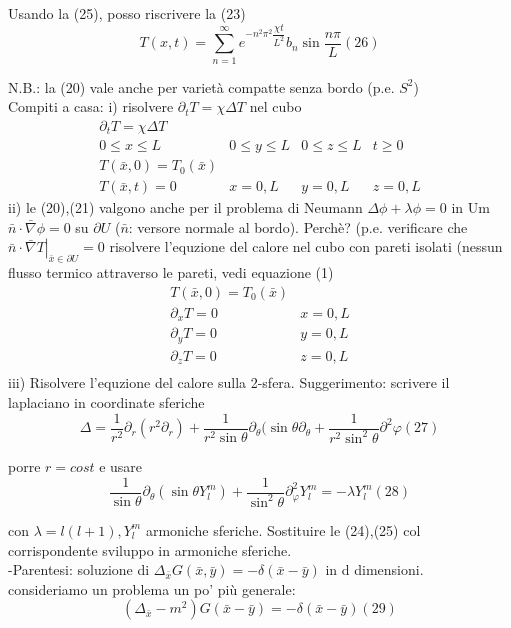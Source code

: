 \documentclass[a4paper,11pt]{report}
\begin{document}
Usando la (25), posso riscrivere la (23)
\begin{equation}
T(x,t)=\sum_{n=1}^{\infty}e^{-n^2\pi^2\dfrac{\chi t}{L^2}}b_n\sin\dfrac{n\pi}{L} (26)
\end{equation}

N.B.: la (20) vale anche per varietà compatte senza bordo (p.e. $S^2$)\\
Compiti a casa:
i) risolvere $\partial_t T=\chi\Delta T$ nel cubo
$$
\begin{matrix}
\partial_t T=\chi\Delta T\\
0\leq x\leq L & 0\leq y\leq L & 0\leq z\leq L & t\geq 0\\
T(\bar{x},0)=T_0(\bar{x})\\
T(\bar{x},t)=0 & x=0,L & y=0,L & z=0,L 
\end{matrix}
$$
ii) le (20),(21) valgono anche per il problema di Neumann $\Delta\phi + \lambda\phi =0$ in Um $\bar{n}\cdot\bar{\nabla}\phi=0$ su $\partial U$ ($\bar{n}$: versore normale al bordo). Perchè? (p.e. verificare che $\left . \bar{n}\cdot\bar{\nabla}T\right|_{\bar{x}\in \partial U}=0$
risolvere l'equzione del calore nel cubo con pareti isolati (nessun flusso termico attraverso le pareti, vedi equazione (1)
$$
\begin{matrix}
T(\bar{x},0)=T_0(\bar{x})\\
\partial_x T=0 & x=0,L \\
\partial_y T=0 & y=0,L \\
\partial_z T=0 & z=0,L \\
\end{matrix}
$$
 iii) Risolvere l'equzione del calore sulla 2-sfera. Suggerimento: scrivere il laplaciano in coordinate sferiche
\begin{equation}
\Delta =\dfrac{1}{r^2}\partial_r(r^2\partial_r)+\dfrac{1}{r^2\sin\theta}\partial_{\theta} (\sin\theta\partial_{\theta}+\dfrac{1}{r^2\sin^2\theta}\partial^2\varphi (27)
\end{equation}

porre $r=cost$ e usare 
\begin{equation}
\dfrac{1}{\sin\theta}\partial_{\theta}(\sin\theta Y^m_l)+\dfrac{1}{\sin^2\theta}\partial^2_{\varphi}Y_l^m=-\lambda Y_l^m (28)
\end{equation}

con $\lambda=l(l+1),Y_l^m$ armoniche sferiche. Sostituire le (24),(25) col corrispondente sviluppo in armoniche sferiche.\\
-Parentesi: soluzione di $\Delta_{\bar{x}}G(\bar{x},\bar{y})=-\delta(\bar{x}-\bar{y})$ in d dimensioni.\\
consideriamo un problema un po' più generale:
\begin{equation}
(\Delta_{\bar{x}}-m^2)G(\bar{x}-\bar{y})=-\delta(\bar{x}-\bar{y}) (29)
\end{equation}
\end{document}

